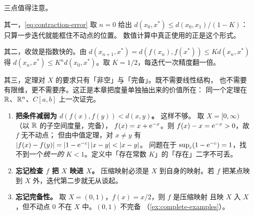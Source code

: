 \begin{remark}
  三点值得注意。

  其一，\cref{eq:contraction-error} 取 \(n=0\) 给出
  \(d(x_{0},x^{*}) \le d(x_{0},x_{1})/(1-K)\)：只算一步迭代就能框住不动点的位置。
  数值计算中真正使用的正是这个形式。

  其二，收敛是指数快的。由 \(d(x_{n+1},x^{*}) = d(f(x_{n}),f(x^{*})) \le K d(x_{n},x^{*})\)
  得 \(d(x_{n},x^{*}) \le K^{n} d(x_{0},x^{*})\)。取 \(K=1/2\)，每迭代一次精度翻一倍。

  其三，定理对 \(X\) 的要求只有「非空」与「完备」。既不需要线性结构，
  也不需要有限维，更不需要序。这正是本章把度量单独抽出来的价值所在：
  同一个定理在 \(\mathbb{R}\)、\(\mathbb{R}^{n}\)、\(C[a,b]\) 上一次证完。
\end{remark}

\begin{pitfall}
  \begin{enumerate}[label=(\arabic*), leftmargin=1.6em]
    \item \textbf{把条件减弱为 \(d(f(x),f(y)) < d(x,y)\)。} 这样不够。
          取 \(X = [0,\infty)\)（以 \(\mathbb{R}\) 的子空间度量，完备），
          \(f(x) = x + \mathrm{e}^{-x}\)。则 \(f(x) - x = \mathrm{e}^{-x} > 0\)，故 \(f\) 无不动点；
          但由中值定理，对 \(x \neq y\) 有
          \(\lvert f(x)-f(y)\rvert = \lvert1-\mathrm{e}^{-c}\rvert\,\lvert x-y\rvert < \lvert x-y\rvert\)。
          问题在于 \(\sup_{c}(1-\mathrm{e}^{-c}) = 1\)，找不到一个\emph{统一的}
          \(K<1\)。定义中「存在常数 \(K\)」的「存在」二字不可丢。
    \item \textbf{忘记检查 \(f\) 把 \(X\) 映进 \(X\)。} 压缩映射必须是
          \(X\) 到自身的映射。若 \(f\) 把某点映到 \(X\) 外，迭代第二步就无从谈起。
    \item \textbf{忘记完备性。} 取 \(X=(0,1)\)，\(f(x)=x/2\)，则 \(f\) 是压缩映射
          且映 \(X\) 入 \(X\)，但不动点 \(0\) 不在 \(X\) 中。\((0,1)\) 不完备
          （\cref{ex:complete-examples}）。
  \end{enumerate}
\end{pitfall}

